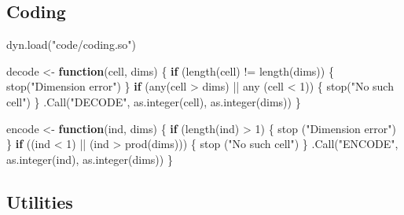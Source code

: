 \documentclass[
  12pt,
]{book}
\newenvironment{Shaded}{\begin{snugshade}}{\end{snugshade}}
\newcommand{\ControlFlowTok}[1]{\textcolor[rgb]{0.13,0.29,0.53}{\textbf{#1}}}
\newcommand{\DecValTok}[1]{\textcolor[rgb]{0.00,0.00,0.81}{#1}}
\newcommand{\FunctionTok}[1]{\textcolor[rgb]{0.00,0.00,0.00}{#1}}
\newcommand{\NormalTok}[1]{#1}
\newcommand{\OtherTok}[1]{\textcolor[rgb]{0.56,0.35,0.01}{#1}}
\newcommand{\SpecialCharTok}[1]{\textcolor[rgb]{0.00,0.00,0.00}{#1}}
\newcommand{\StringTok}[1]{\textcolor[rgb]{0.31,0.60,0.02}{#1}}
\begin{document}
\hypertarget{coding}{%
\subsection{Coding}\label{coding}}

\begin{Shaded}
\begin{Highlighting}[]
\FunctionTok{dyn.load}\NormalTok{(}\StringTok{"code/coding.so"}\NormalTok{)}

\NormalTok{decode }\OtherTok{\textless{}{-}} \ControlFlowTok{function}\NormalTok{(cell, dims) \{}
  \ControlFlowTok{if}\NormalTok{ (}\FunctionTok{length}\NormalTok{(cell) }\SpecialCharTok{!=} \FunctionTok{length}\NormalTok{(dims)) \{}
    \FunctionTok{stop}\NormalTok{(}\StringTok{"Dimension error"}\NormalTok{)}
\NormalTok{  \}}
  \ControlFlowTok{if}\NormalTok{ (}\FunctionTok{any}\NormalTok{(cell }\SpecialCharTok{\textgreater{}}\NormalTok{ dims) }\SpecialCharTok{||} \FunctionTok{any}\NormalTok{ (cell }\SpecialCharTok{\textless{}} \DecValTok{1}\NormalTok{)) \{}
    \FunctionTok{stop}\NormalTok{(}\StringTok{"No such cell"}\NormalTok{)}
\NormalTok{  \}}
  \FunctionTok{.Call}\NormalTok{(}\StringTok{"DECODE"}\NormalTok{, }\FunctionTok{as.integer}\NormalTok{(cell), }\FunctionTok{as.integer}\NormalTok{(dims))}
\NormalTok{\}}


\NormalTok{encode }\OtherTok{\textless{}{-}} \ControlFlowTok{function}\NormalTok{(ind, dims) \{}
  \ControlFlowTok{if}\NormalTok{ (}\FunctionTok{length}\NormalTok{(ind) }\SpecialCharTok{\textgreater{}} \DecValTok{1}\NormalTok{) \{}
    \FunctionTok{stop}\NormalTok{ (}\StringTok{"Dimension error"}\NormalTok{)}
\NormalTok{  \}}
  \ControlFlowTok{if}\NormalTok{ ((ind }\SpecialCharTok{\textless{}} \DecValTok{1}\NormalTok{) }\SpecialCharTok{||}\NormalTok{ (ind }\SpecialCharTok{\textgreater{}} \FunctionTok{prod}\NormalTok{(dims))) \{}
    \FunctionTok{stop}\NormalTok{ (}\StringTok{"No such cell"}\NormalTok{)}
\NormalTok{  \}}
  \FunctionTok{.Call}\NormalTok{(}\StringTok{"ENCODE"}\NormalTok{, }\FunctionTok{as.integer}\NormalTok{(ind), }\FunctionTok{as.integer}\NormalTok{(dims))}
\NormalTok{\}}
\end{Highlighting}
\end{Shaded}

\hypertarget{utilities}{%
\subsection{Utilities}\label{utilities}}
\end{document}
